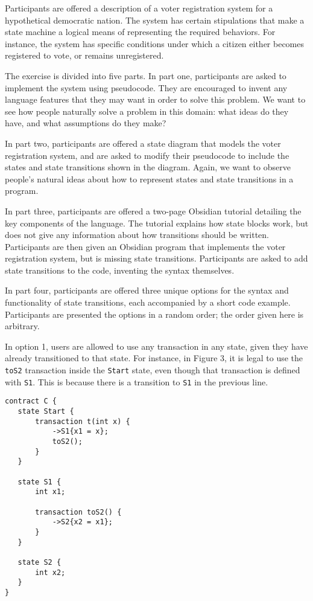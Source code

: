 \documentclass[sigplan,10pt,review]{acmart}\settopmatter{printfolios=true}
\begin{document}
Participants are offered a description of a voter registration system for a hypothetical democratic nation. The 
system has certain stipulations that make a state machine a logical means of representing the required behaviors. 
For instance, the system has specific conditions under which a citizen either becomes registered to vote, or remains unregistered. 

The exercise is divided into five parts. In part one, participants are asked to implement the system using 
pseudocode. They are encouraged to invent any language features that they may want in order to solve this 
problem. We want to see how people naturally solve a problem in this domain: what ideas do they 
have, and what assumptions do they make? 
	
In part two, participants are offered a state diagram that models the voter registration system, and are asked to 
modify their pseudocode to include the states and state transitions shown in the diagram. Again, we want to 
observe people's natural ideas about how to represent states and state transitions in a program.

In part three, participants are offered a two-page Obsidian tutorial detailing the key components of the language. 
The tutorial explains how state blocks work, but does not give any information about how transitions should be 
written. Participants are then given an Obsidian program that implements the voter registration system, but is 
missing state transitions. Participants are asked to add state transitions to the code, inventing the syntax 
themselves.

In part four, participants are offered three unique options for the syntax and functionality of state transitions, each 
accompanied by a short code example. Participants are presented the options in a random order; the order given 
here is arbitrary.

In option 1, users are allowed to use any transaction in any state, given they have already transitioned to that 
state. For instance, in Figure 3, it is legal to use the \texttt{\small{toS2}} transaction inside the \texttt{\small{Start}} 
state, even though that transaction is defined with \texttt{\small{S1}}. This is because there is a transition to 
\texttt{\small{S1}} in the previous line.

\begin{lstlisting}[caption={One option for state transitions},captionpos=b]
contract C {
   state Start {
       transaction t(int x) {
           ->S1{x1 = x};
           toS2();
       }
   }

   state S1 {
       int x1;

       transaction toS2() {
           ->S2{x2 = x1};
       }
   }

   state S2 {
       int x2;
   }
}
\end{lstlisting}
\end{document}
